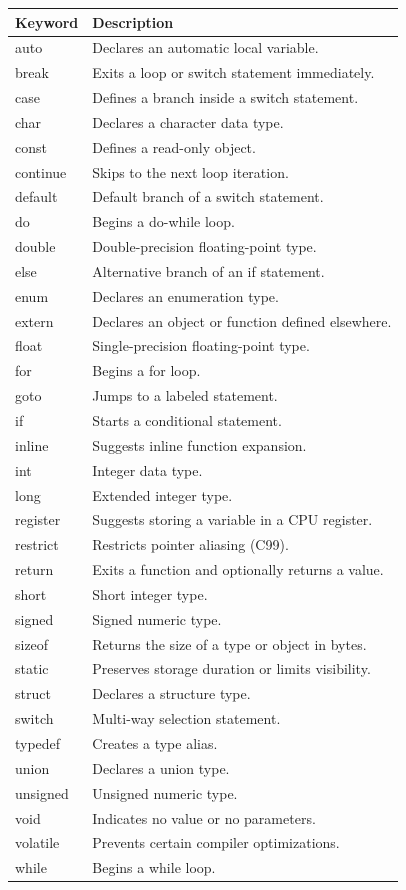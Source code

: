 \documentclass[12pt,openany]{book}
\begin{document}
\begin{center}
\begin{tabular}{|l|p{9cm}|}
\hline
Keyword & Description \\
\hline
auto & Declares an automatic local variable. \\
break & Exits a loop or switch statement immediately. \\
case & Defines a branch inside a switch statement. \\
char & Declares a character data type. \\
const & Defines a read-only object. \\
continue & Skips to the next loop iteration. \\
default & Default branch of a switch statement. \\
do & Begins a do-while loop. \\
double & Double-precision floating-point type. \\
else & Alternative branch of an if statement. \\
enum & Declares an enumeration type. \\
extern & Declares an object or function defined elsewhere. \\
float & Single-precision floating-point type. \\
for & Begins a for loop. \\
goto & Jumps to a labeled statement. \\
if & Starts a conditional statement. \\
inline & Suggests inline function expansion. \\
int & Integer data type. \\
long & Extended integer type. \\
register & Suggests storing a variable in a CPU register. \\
restrict & Restricts pointer aliasing (C99). \\
return & Exits a function and optionally returns a value. \\
short & Short integer type. \\
signed & Signed numeric type. \\
sizeof & Returns the size of a type or object in bytes. \\
static & Preserves storage duration or limits visibility. \\
struct & Declares a structure type. \\
switch & Multi-way selection statement. \\
typedef & Creates a type alias. \\
union & Declares a union type. \\
unsigned & Unsigned numeric type. \\
void & Indicates no value or no parameters. \\
volatile & Prevents certain compiler optimizations. \\
while & Begins a while loop. \\
\hline
\end{tabular}
\end{center}
\end{document}
